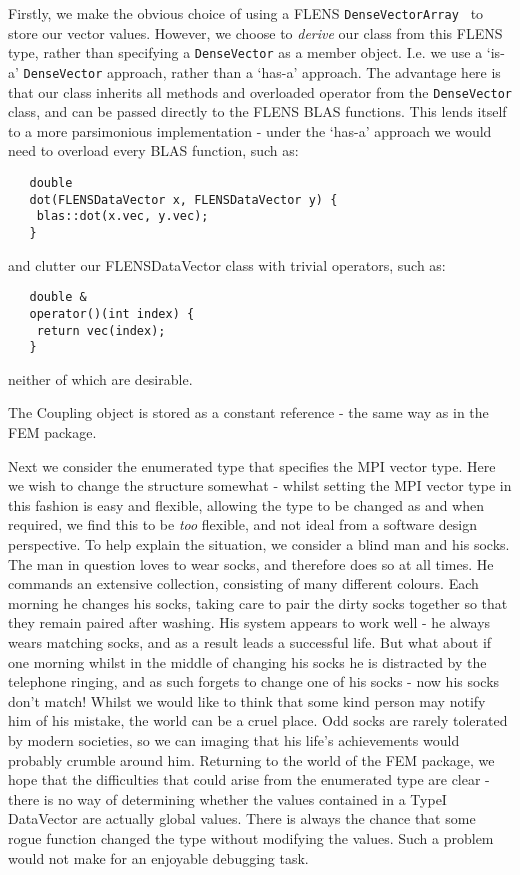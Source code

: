 Firstly, we make the obvious choice of using a FLENS \texttt{DenseVector\<Array\<\double\> \>} to store our vector values. However, we choose to \emph{derive} our class from this FLENS type, rather than specifying a \texttt{DenseVector} as a member object. I.e. we use a `is-a' \texttt{DenseVector} approach, rather than a `has-a' approach. The advantage here is that our class inherits all methods and overloaded operator from the \texttt{DenseVector} class, and can be passed directly to the FLENS BLAS functions. This lends itself to a more parsimonious implementation - under the `has-a' approach we would need to overload every BLAS function, such as: 
\begin{lstlisting}
   double
   dot(FLENSDataVector x, FLENSDataVector y) {
   	blas::dot(x.vec, y.vec);
   }
\end{lstlisting}

and clutter our FLENSDataVector class with trivial operators, such as:

\begin{lstlisting}
   double &
   operator()(int index) {
   	return vec(index);
   }
\end{lstlisting}

neither of which are desirable.

The Coupling object is stored as a constant reference - the same way as in the FEM package.

Next we consider the enumerated type that specifies the MPI vector type. Here we wish to change the structure somewhat - whilst setting the MPI vector type in this fashion is easy and flexible, allowing the type to be changed as and when required, we find this to be \emph{too} flexible, and not ideal from a software design perspective. To help explain the situation, we consider a blind man and his socks. The man in question loves to wear socks, and therefore does so at all times. He commands an extensive collection, consisting of many different colours. Each morning he changes his socks, taking care to pair the dirty socks together so that they remain paired after washing. His system appears to work well - he always wears matching socks, and as a result leads a successful life. But what about if one morning whilst in the middle of changing his socks he is distracted by the telephone ringing, and as such forgets to change one of his socks - now his socks don't match! Whilst we would like to think that some kind person may notify him of his mistake, the world can be a cruel place. Odd socks are rarely tolerated by modern societies, so we can imaging that his life's achievements would probably crumble around him. Returning to the world of the FEM package, we hope that the difficulties that could arise from the enumerated type are clear - there is no way of determining whether the values contained in a TypeI DataVector are actually global values. There is always the chance that some rogue function changed the type without modifying the values. Such a problem would not make for an enjoyable debugging task.

